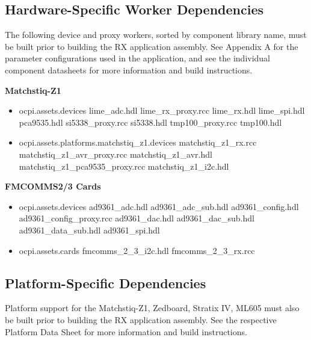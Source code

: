 \subsection{Hardware-Specific Worker Dependencies}
The following device and proxy workers, sorted by component library name, must be built prior to building the RX application assembly. See Appendix A for the parameter configurations used in the application, and see the individual component datasheets for more information and build instructions.\par\bigskip
	\begin{minipage}[t]{.33\textwidth}
	\textbf{Matchstiq-Z1}
	\begin{itemize}
		\item ocpi.assets.devices
			\subitem lime\_adc.hdl
			\subitem lime\_rx\_proxy.rcc
			\subitem lime\_rx.hdl
			\subitem lime\_spi.hdl
			\subitem pca9535.hdl
			\subitem si5338\_proxy.rcc
			\subitem si5338.hdl
			\subitem tmp100\_proxy.rcc
			\subitem tmp100.hdl
		\item ocpi.assets.platforms.matchstiq\_z1.devices
			\subitem matchstiq\_z1\_rx.rcc
			\subitem matchstiq\_z1\_avr\_proxy.rcc
			\subitem matchstiq\_z1\_avr.hdl
			\subitem matchstiq\_z1\_pca9535\_proxy.rcc
			\subitem matchstiq\_z1\_i2c.hdl
	\end{itemize}
	\end{minipage}
	\begin{minipage}[t]{.33\textwidth}
	\textbf{FMCOMMS2/3 Cards}
	\begin{itemize}
		\item ocpi.assets.devices
			\subitem ad9361\_adc.hdl
			\subitem ad9361\_adc\_sub.hdl
			\subitem ad9361\_config.hdl
			\subitem ad9361\_config\_proxy.rcc
			\subitem ad9361\_dac.hdl
			\subitem ad9361\_dac\_sub.hdl
			\subitem ad9361\_data\_sub.hdl
			\subitem ad9361\_spi.hdl
	\end{itemize}
	\begin{itemize}
		\item ocpi.assets.cards
			\subitem fmcomms\_2\_3\_i2c.hdl
			\subitem fmcomms\_2\_3\_rx.rcc
	\end{itemize}

	\end{minipage} \medskip

\subsection{Platform-Specific Dependencies}

Platform support for the Matchstiq-Z1, Zedboard, Stratix IV, ML605 must also be built prior to building the RX application assembly. See the respective Platform Data Sheet for more information and build instructions.
\newpage

